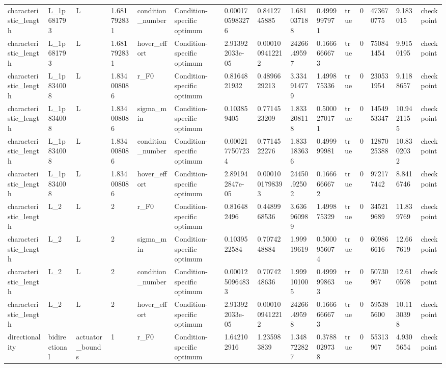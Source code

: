 \begin{tabular}{@{}lllllllllllllll@{}}
characteristic\_length & L\_1p681793 & L & 1.681792831 & condition\_number & Condition-specific optimum & 0.0001705983276 & 0.8412745885 & 1.681037188 & 0.4999997971 & true & 0 & 473670775 & 9.183015 & checkpoint \\
characteristic\_length & L\_1p681793 & L & 1.681792831 & hover\_effort & Condition-specific optimum & 2.913922033e-05 & 0.0001009412212 & 24266.49597 & 0.1666666673 & true & 0 & 750841454 & 9.9150195 & checkpoint \\
characteristic\_length & L\_1p834008 & L & 1.834008086 & r\_F0 & Condition-specific optimum & 0.8164821932 & 0.4896629213 & 3.334914779 & 1.499875336 & true & 0 & 230531954 & 9.1188657 & checkpoint \\
characteristic\_length & L\_1p834008 & L & 1.834008086 & sigma\_min & Condition-specific optimum & 0.103859405 & 0.7714523209 & 1.833208118 & 0.5000270171 & true & 0 & 1454953347 & 10.9421155 & checkpoint \\
characteristic\_length & L\_1p834008 & L & 1.834008086 & condition\_number & Condition-specific optimum & 0.0002177507234 & 0.7714522276 & 1.833183636 & 0.499999981 & true & 0 & 1287025388 & 10.8302032 & checkpoint \\
characteristic\_length & L\_1p834008 & L & 1.834008086 & hover\_effort & Condition-specific optimum & 2.891942847e-05 & 0.0001001798393 & 24450.92502 & 0.1666666672 & true & 0 & 972177442 & 8.8416746 & checkpoint \\
characteristic\_length & L\_2 & L & 2 & r\_F0 & Condition-specific optimum & 0.816482496 & 0.4489968536 & 3.636960989 & 1.499875329 & true & 0 & 345219689 & 11.839769 & checkpoint \\
characteristic\_length & L\_2 & L & 2 & sigma\_min & Condition-specific optimum & 0.1039522584 & 0.7074248884 & 1.99919619 & 0.5000956074 & true & 0 & 609866616 & 12.667619 & checkpoint \\
characteristic\_length & L\_2 & L & 2 & condition\_number & Condition-specific optimum & 0.0001250964833 & 0.7074248636 & 1.999101005 & 0.4999998633 & true & 0 & 50730967 & 12.610598 & checkpoint \\
characteristic\_length & L\_2 & L & 2 & hover\_effort & Condition-specific optimum & 2.913922033e-05 & 0.0001009412212 & 24266.49598 & 0.1666666673 & true & 0 & 595385600 & 10.1130398 & checkpoint \\
directionality & bidirectional & actuator\_bounds & 1 & r\_F0 & Condition-specific optimum & 1.642102916 & 1.235983839 & 1.348722827 & 0.3788029738 & true & 0 & 55313967 & 4.9305654 & checkpoint \\

\end{tabular}
